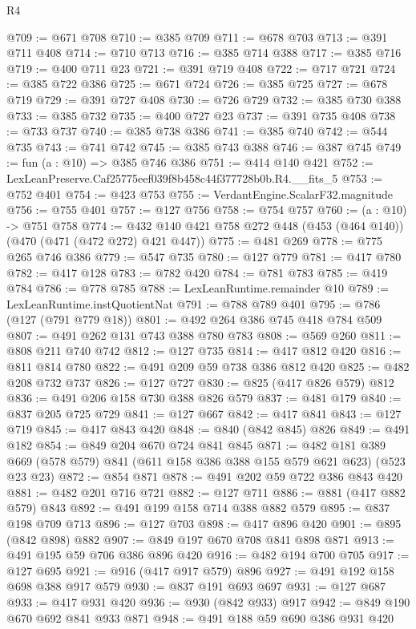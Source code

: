 \begin{lexlean}{R4}
\begin{coremodule}
@709 := @671 @708
@710 := @385 @709
@711 := @678 @703
@713 := @391 @711 @408
@714 := @710 @713
@716 := @385 @714 @388
@717 := @385 @716
@719 := @400 @711 @23
@721 := @391 @719 @408
@722 := @717 @721
@724 := @385 @722 @386
@725 := @671 @724
@726 := @385 @725
@727 := @678 @719
@729 := @391 @727 @408
@730 := @726 @729
@732 := @385 @730 @388
@733 := @385 @732
@735 := @400 @727 @23
@737 := @391 @735 @408
@738 := @733 @737
@740 := @385 @738 @386
@741 := @385 @740
@742 := @544 @735
@743 := @741 @742
@745 := @385 @743 @388
@746 := @387 @745
@749 := fun (a : @10) => @385 @746 @386
@751 := @414 @140 @421
@752 := LexLeanPreserve.Caf25775eef039f8b458c44f377728b0b.R4.__fits_5
@753 := @752 @401
@754 := @423 @753
@755 := VerdantEngine.ScalarF32.magnitude
@756 := @755 @401
@757 := @127 @756
@758 := @754 @757
@760 := (a : @10) -> @751 @758
@774 := @432 @140 @421 @758 @272 @448 (@453 (@464 @140)) (@470 (@471 (@472 @272) @421 @447))
@775 := @481 @269
@778 := @775 @265 @746 @386
@779 := @547 @735
@780 := @127 @779
@781 := @417 @780
@782 := @417 @128
@783 := @782 @420
@784 := @781 @783
@785 := @419 @784
@786 := @778 @785
@788 := LexLeanRuntime.remainder @10
@789 := LexLeanRuntime.instQuotientNat
@791 := @788 @789 @401
@795 := @786 (@127 (@791 @779 @18))
@801 := @492 @264 @386 @745 @418 @784 @509
@807 := @491 @262 @131 @743 @388 @780 @783
@808 := @569 @260
@811 := @808 @211 @740 @742
@812 := @127 @735
@814 := @417 @812 @420
@816 := @811 @814 @780
@822 := @491 @209 @59 @738 @386 @812 @420
@825 := @482 @208 @732 @737
@826 := @127 @727
@830 := @825 (@417 @826 @579) @812
@836 := @491 @206 @158 @730 @388 @826 @579
@837 := @481 @179
@840 := @837 @205 @725 @729
@841 := @127 @667
@842 := @417 @841
@843 := @127 @719
@845 := @417 @843 @420
@848 := @840 (@842 @845) @826
@849 := @491 @182
@854 := @849 @204 @670 @724 @841 @845
@871 := @482
    @181
    @389
    @669
    (@578 @579)
    @841
    (@611 @158 @386 @388 @155 @579 @621 @623)
    (@523 @23 @23)
@872 := @854 @871
@878 := @491 @202 @59 @722 @386 @843 @420
@881 := @482 @201 @716 @721
@882 := @127 @711
@886 := @881 (@417 @882 @579) @843
@892 := @491 @199 @158 @714 @388 @882 @579
@895 := @837 @198 @709 @713
@896 := @127 @703
@898 := @417 @896 @420
@901 := @895 (@842 @898) @882
@907 := @849 @197 @670 @708 @841 @898 @871
@913 := @491 @195 @59 @706 @386 @896 @420
@916 := @482 @194 @700 @705
@917 := @127 @695
@921 := @916 (@417 @917 @579) @896
@927 := @491 @192 @158 @698 @388 @917 @579
@930 := @837 @191 @693 @697
@931 := @127 @687
@933 := @417 @931 @420
@936 := @930 (@842 @933) @917
@942 := @849 @190 @670 @692 @841 @933 @871
@948 := @491 @188 @59 @690 @386 @931 @420

\end{coremodule}
\end{lexlean}
